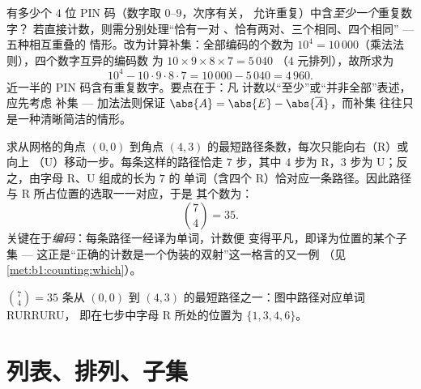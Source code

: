 \begin{example}[补集计数]\label{ex:b1:counting:complement}
有多少个 $4$ 位 PIN 码（数字取 $0$--$9$，次序有关，
允许重复）中含\emph{至少一个}重复数字？
若直接计数，则需分别处理“恰有一对
、恰有两对、三个相同、四个相同” --- 五种相互重叠的
情形。改为计算补集：全部编码的个数为
$10^4 = 10\,000$（乘法法则），四个数字互异的编码数
为 $10 \times 9 \times 8 \times 7 = 5\,040$
（$4$ 元排列），故所求为
\[
10^4 - 10 \cdot 9 \cdot 8 \cdot 7 = 10\,000 - 5\,040 = 4\,960 .
\]
近一半的 PIN 码含有重复数字。要点在于：凡
计数以“至少”或“并非全部”表述，应先考虑
补集 --- 加法法则保证
$\abs{A} = \abs{E} - \abs{\overline A}$，而补集
往往只是一种清晰简洁的情形。
\end{example}

\begin{example}[格路]\label{ex:b1:counting:paths}
求从网格的角点 $(0,0)$ 到角点
$(4, 3)$ 的最短路径条数，每次只能向右（R）或向上
（U）移动一步。每条这样的路径恰走 $7$ 步，其中
$4$ 步为 R，$3$ 步为 U；反之，由字母 R、U 组成的长为 $7$ 的
单词（含四个 R）恰对应一条路径。因此路径
与 R 所占位置的选取一一对应，于是
其个数为：
\[
\binom{7}{4} = 35 .
\]
关键在于\emph{编码}：每条路径一经译为单词，计数便
变得平凡，即译为位置的某个子集 ---
这正是“正确的计数是一个伪装的双射”这一格言的又一例
（见\cref{met:b1:counting:which}）。
\end{example}

\begin{omfigure}

{\small $\binom74 = 35$ 条从 $(0,0)$ 到
$(4,3)$ 的最短路径之一：图中路径对应单词 RURRURU，
即在七步中字母 R 所处的位置为
$\{1,3,4,6\}$。}
\end{omfigure}

\section{列表、排列、子集}

